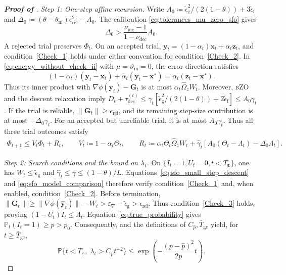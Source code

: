 \documentclass{article}
\begin{document}
\begin{proof}[\textbf{Proof of }]
\label{proof:mu_zero_sfo_bzo}
\noindent\emph{Step 1: One-step affine recursion.}
Write \(A_0\coloneqq \widetilde\epsilon_{\mathrm{g}}^2/(2(1-\theta))
+3\widetilde\epsilon_{\mathrm{f}}\) and
\(\Delta_0\coloneqq (\theta-\theta_{\mathrm{m}})\epsilon_{\mathrm{rel}}^2-A_0\).
The calibration \eqref{eq:tolerances_mu_zero_sfo} gives
\begin{equation}\label{eq:regulated_general_convex_margin}
\Delta_0>\frac{\nu_{\mathrm{inc}}-1}{1-\nu_{\mathrm{dec}}}A_0.
\end{equation}
A rejected trial preserves \(\Phi_t\). On an accepted trial,
\(\bm{y}_t=(1-\alpha_t)\bm{x}_t+\alpha_t\bm{z}_t\), and condition~\eqref{Check_1}
holds under either convention for condition~\eqref{Check_2}.
In \eqref{eq:energy_without_check_ii} with
\(\mu=\vartheta_{\mathrm{m}}=0\), the error direction satisfies
\[
(1-\alpha_t)(\bm{y}_t-\bm{x}_t)+\alpha_t(\bm{y}_t-\bm{x}^\star)
=\alpha_t(\bm{z}_t-\bm{x}^\star).
\]
Thus its inner product with \(\nabla\phi(\bm{y}_t)-\mathbf{G}_t\)
is at most \(\alpha_t\widehat\Omega_zW_t\).
Moreover, \textsc{bZO} and the descent relaxation imply
\(D_t+\tau_{\mathrm{des}}^{(t)}
\le\gamma_t[\widetilde\epsilon_{\mathrm{g}}^2/(2(1-\theta))
+2\widetilde\epsilon_{\mathrm{f}}]\le A_0\gamma_t\).
If the trial is reliable,
\(\|\mathbf{G}_t\|\ge\epsilon_{\mathrm{rel}}\), and its remaining
step-size contribution is at most \(-\Delta_0\gamma_t\).
For an accepted but unreliable trial, it is at most \(A_0\gamma_t\).
Thus all three trial outcomes satisfy
\begin{equation}\label{eq:regulated_affine_modules_mu_zero}
\begin{aligned}
\Phi_{t+1}\le V_t\Phi_t+R_t,\qquad V_t\coloneqq 1-\alpha_t\Theta_t,\qquad
R_t\coloneqq \alpha_t\Theta_t\widehat\Omega_zW_t+
\hat\gamma_t[A_0(\Theta_t-\Lambda_t)-\Delta_0\Lambda_t].
\end{aligned}
\end{equation}

\par\smallskip
\noindent\emph{Step 2: Search conditions and the bound on \(\lambda_t\).}
On \(\{I_t=1,U_t=0,t<T_{\boldsymbol\varepsilon}\}\), one has
\(W_t\le\widetilde\epsilon_{\mathrm{g}}\) and
\(\hat\gamma_t\le\bar\gamma\le(1-\theta)/L\).
Equations~\eqref{eq:sfo_small_step_descent} and
\eqref{eq:sfo_model_comparison} therefore verify condition~\eqref{Check_1}
and, when enabled, condition~\eqref{Check_2}. Before termination,
\(\|\mathbf{G}_t\|\ge\|\nabla\phi(\hat {\bm{y}}_t)\|-W_t
>\varepsilon_\nabla-\widetilde\epsilon_{\mathrm{g}}>\epsilon_{\mathrm{rel}}\).
Thus condition~\eqref{Check_3} holds, proving
\((1-U_t)I_t\le\Lambda_t\). Equation~\eqref{eq:true_probability} gives
\(\mathbb P_t(I_t=1)\ge p>p_0\). Consequently,
 and the definitions of
\(C_{\hat p},\bar T_{\mathrm{gc}}\) yield, for \(t\ge\bar T_{\mathrm{gc}}\),
\begin{equation}\label{eq:regulated_lambda_tail_mu_zero_sfo}
\mathbb P\{t<T_{\boldsymbol\varepsilon},\;
\lambda_t>C_{\hat p}t^{-2}\}
\le\exp\left(-\frac{(p-\hat p)^2}{2p}t\right).
\end{equation}


\end{proof}
\end{document}
